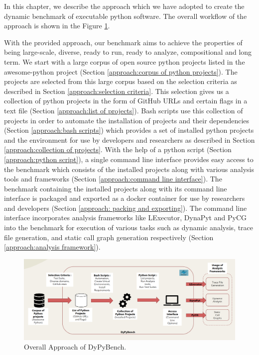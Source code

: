 In this chapter, we describe the approach which we have adopted to create the dynamic benchmark of executable python software. The overall workflow of the approach is shown in the Figure \ref{fig:overall_approach}.

With the provided approach, our benchmark aims to achieve the properties of being large-scale, diverse, ready to run, ready to analyze, compositional and long term. We start with a large corpus of open source python projects listed in the awesome-python project (Section \ref{approach:corpus of python projects}). The projects are selected from this large corpus based on the selection criteria as described in Section \ref{approach:selection criteria}. This selection gives us a collection of python projects in the form of GitHub URLs and certain flags in a text file (Section \ref{approach:list of projects}). Bash scripts use this collection of projects in order to automate the installation of projects and their dependencies (Section \ref{approach:bash scripts}) which provides a set of installed python projects and the environment for use by developers and researchers as described in Section \ref{approach:collection of projects}. With the help of a python script (Section \ref{approach:python script}), a single command line interface provides easy access to the benchmark which consists of the installed projects along with various analysis tools and frameworks (Section \ref{approach:command line interface}). The benchmark containing the installed projects along with its command line interface is packaged and exported as a docker container for use by researchers and developers (Section \ref{approach: packing and exporting}). The command line interface incorporates  analysis frameworks like LExecutor, DynaPyt and PyCG into the benchmark for execution of various tasks such as dynamic analysis, trace file generation, and static call graph generation respectively (Section \ref{approach:analysis framework}).

\begin{figure}[ht]
\centering
\includegraphics[width=1\linewidth]{figures/approach/DyPyBench.png}
\caption[Approach]{\label{fig:overall_approach}Overall Approach of DyPyBench.}
\end{figure}

